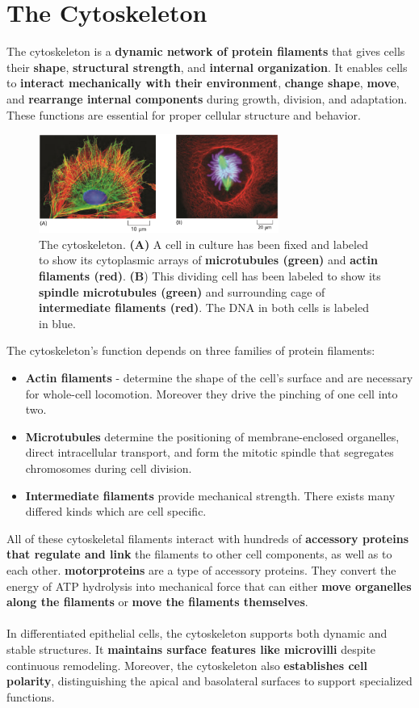 \documentclass[../main.tex]{subfiles}
\begin{document}
\section{The Cytoskeleton}
The cytoskeleton is a \textbf{dynamic network of protein filaments} that gives cells their \textbf{shape}, \textbf{structural strength}, and \textbf{internal organization}. It enables cells to \textbf{interact mechanically with their environment}, \textbf{change shape}, \textbf{move}, and \textbf{rearrange internal components} during growth, division, and adaptation. These functions are essential for proper cellular structure and behavior.
\begin{figure}[H]
	\centering
	\includegraphics[width = 0.7\textwidth]{1}
	\caption{The cytoskeleton. \textbf{(A)} A cell in culture has been fixed and labeled to show its cytoplasmic arrays of \textbf{microtubules (green)} and \textbf{actin filaments (red)}. \textbf{(B}) This dividing cell has been labeled to show its \textbf{spindle microtubules (green)} and surrounding cage of \textbf{intermediate filaments (red)}. The DNA in both cells is labeled in blue.}
\end{figure}
The cytoskeleton's function depends on three families of protein filaments: 
\begin{itemize}
	\item \textbf{Actin filaments} - determine the shape of the cell’s surface and are necessary for whole-cell locomotion. Moreover they drive the pinching of one cell into two. 
	
	\item \textbf{Microtubules} determine the positioning of membrane-enclosed organelles, direct intracellular transport, and form the mitotic spindle that segregates chromosomes during cell division.
	
	\item \textbf{Intermediate filaments} provide mechanical strength. There exists many differed kinds which are cell specific. 
\end{itemize}
All of these cytoskeletal filaments interact with hundreds of \textbf{accessory proteins that regulate and link} the filaments to other cell components, as well as to each other. \textbf{\gls{motorproteins}} are a type of accessory proteins. They convert the energy of ATP hydrolysis into mechanical force that can either \textbf{move organelles along the filaments} or \textbf{move the filaments themselves}.\\
\\
In differentiated epithelial cells, the cytoskeleton supports both dynamic and stable structures. It \textbf{maintains surface features like \gls{microvilli}} despite continuous remodeling. Moreover, the cytoskeleton also \textbf{establishes cell polarity}, distinguishing the apical and basolateral surfaces to support specialized functions.
\end{document}
